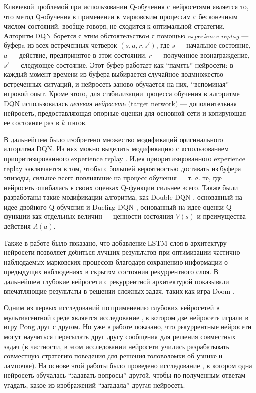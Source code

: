 \documentclass[specification,annotation,times]{itmo-student-thesis}
\theoremstyle{definition}
\begin{document}
Ключевой проблемой при использовании Q-обучения с нейросетями является то, что
метод Q-обучения в применении к марковским процессам с бесконечным числом
состояний, вообще говоря, не сходится к оптимальной стратегии. Алгоритм DQN
борется с этим обстоятельством с помощью \textit{experience replay} --- буферa
из всех встреченных четверок $(s, a, r, s')$, где $s$ ---
начальное состояние, $a$ --- действие, предпринятое в этом состоянии, $r$ ---
полученное вознаграждение, $s'$ --- следующее состояние. Этот буфер работает как
\enquote{память} нейросети: в каждый момент времени из буфера выбирается случайное
подмножество встреченных ситуаций, и нейросеть заново обучается на них,
\enquote{вспоминая} игровой опыт. Кроме этого, для стабилизации процесса обучения в
алгоритме DQN использовалась \textit{целевая нейросеть} (target network) ---
дополнительная нейросеть, предоставляющая опорные оценки для основной сети и
копирующая ее состояние раз в $k$ шагов.

В дальнейшем было изобретено множество модификаций оригинального алгоритма DQN.
Из них можно выделить модификацию с использованием приоритизированного
experience replay \cite{schaul2015prioritized}. Идея приоритизированного
experience replay заключается в том, чтобы с большей вероятностью доставать из
буфера эпизоды, сильнее всего повлиявшие на процесс обучения --- т. е. те,
где нейросеть ошибалась в своих оценках Q-функции сильнее всего.
Также были разработаны такие модификации алгоритма, как Double
DQN \cite{van2016deep}, основанный на идее двойного
Q-обучения \cite{hasselt2010double} и Dueling DQN \cite{wang2015dueling},
основанный на идее оценки Q-функции как отдельных величин --- ценности состояния
$V(s)$ и преимущества действия $A(a)$.

Также в работе \cite{hausknecht2015deep} было показано, что добавление
LSTM-слоя \cite{hochreiter1997long} в архитектуру нейросети позволяет добиться
лучших результатов при оптимизации частично наблюдаемых марковских процессов
благодаря сохранению информации о предыдущих наблюдениях в скрытом состоянии
рекуррентного слоя. В дальнейшем глубокие нейросети с рекуррентной архитектурой
показывали впечатляющие результаты в решении сложных задач, таких как игра
Doom \cite{lample2016playing}.

Одним из первых исследований по применению глубоких нейросетей в мультиагентной
среде является исследование \cite{tampuu2017multiagent}, в котором две нейросети
играли в игру Pong друг с другом. Но уже в работе \cite{foerster2016learning}
показано, что рекуррентные нейросети могут научиться пересылать друг другу сообщения для решения
совместных задач (в частности, в этом исследовании нейросети учились
разрабатывать совместную стратегию поведения для решения головоломки об узнике и
лампочке). На основе этой работы было проведено исследование
\cite{jorge2016learning}, в котором одна нейросеть обучалась
\enquote{задавать вопросы} другой, чтобы по полученным ответам угадать, какое из
изображений \enquote{загадала} другая нейросеть.
\end{document}
